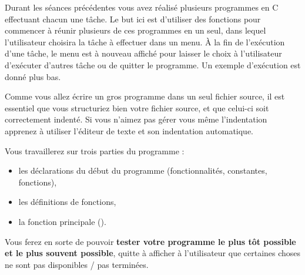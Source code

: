 

Durant les séances précédentes vous avez réalisé plusieurs programmes en C
effectuant chacun une tâche. Le but ici est d'utiliser des
fonctions pour commencer à réunir plusieurs de ces programmes en un
seul, dans lequel l'utilisateur choisira la tâche à effectuer dans un
menu. À la fin de l'exécution d'une tâche, le menu est à nouveau
affiché pour laisser le choix à l'utilisateur d'exécuter d'autres
tâche ou de quitter le programme. Un exemple d'exécution est donné
plus bas.

Comme vous allez écrire un gros programme dans un seul fichier source, il est
essentiel que vous structuriez bien votre fichier source, et que
celui-ci soit correctement indenté. Si vous n'aimez pas gérer vous
même l'indentation apprenez à utiliser l'éditeur de texte  et son
indentation automatique.

Vous travaillerez sur trois parties du programme :
  \begin{itemize}
  \item les déclarations du début du programme (fonctionnalités,
    constantes, fonctions),
  \item les définitions de fonctions,
  \item la fonction principale ().
  \end{itemize}

Vous ferez en sorte de pouvoir \textbf{tester votre programme le plus tôt
possible et le plus souvent possible}, quitte à afficher à l'utilisateur que certaines choses ne
sont pas disponibles / pas terminées. 

